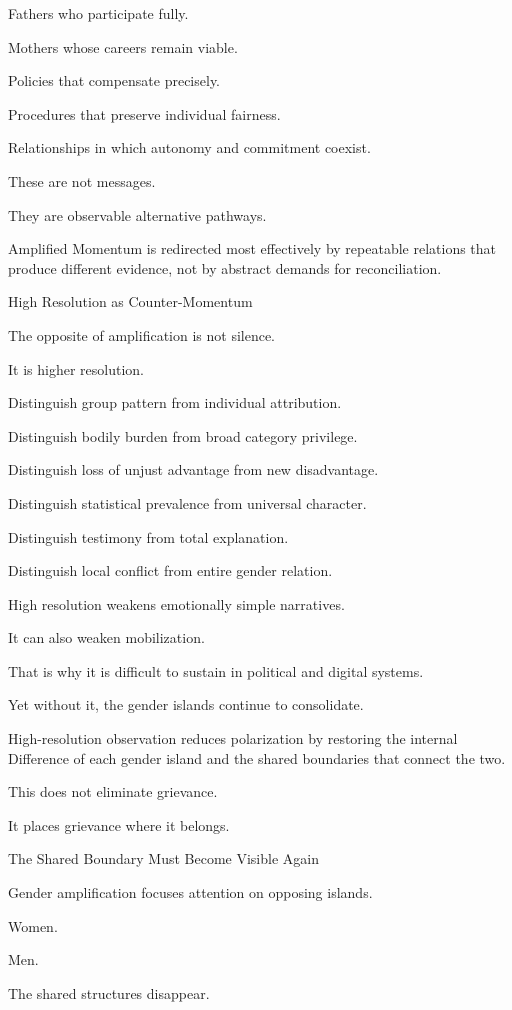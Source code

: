Fathers who participate fully.

Mothers whose careers remain viable.

Policies that compensate precisely.

Procedures that preserve individual fairness.

Relationships in which autonomy and commitment coexist.

These are not messages.

They are observable alternative pathways.

Amplified Momentum is redirected most effectively by repeatable relations that produce different evidence, not by abstract demands for reconciliation.

High Resolution as Counter-Momentum

The opposite of amplification is not silence.

It is higher resolution.

Distinguish group pattern from individual attribution.

Distinguish bodily burden from broad category privilege.

Distinguish loss of unjust advantage from new disadvantage.

Distinguish statistical prevalence from universal character.

Distinguish testimony from total explanation.

Distinguish local conflict from entire gender relation.

High resolution weakens emotionally simple narratives.

It can also weaken mobilization.

That is why it is difficult to sustain in political and digital systems.

Yet without it, the gender islands continue to consolidate.

High-resolution observation reduces polarization by restoring the internal Difference of each gender island and the shared boundaries that connect the two.

This does not eliminate grievance.

It places grievance where it belongs.

The Shared Boundary Must Become Visible Again

Gender amplification focuses attention on opposing islands.

Women.

Men.

The shared structures disappear.

